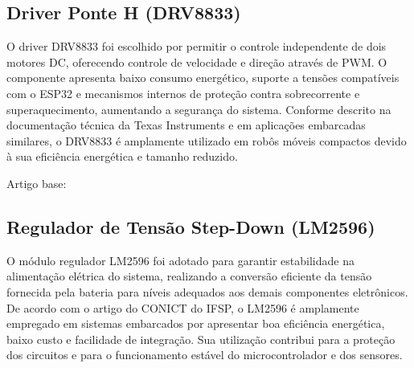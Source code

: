 

\subsection{Driver Ponte H (DRV8833)}

O driver DRV8833 foi escolhido por permitir o controle independente de dois motores DC, oferecendo controle de velocidade e direção através de PWM. O componente apresenta baixo consumo energético, suporte a tensões compatíveis com o ESP32 e mecanismos internos de proteção contra sobrecorrente e superaquecimento, aumentando a segurança do sistema. Conforme descrito na documentação técnica da Texas Instruments e em aplicações embarcadas similares, o DRV8833 é amplamente utilizado em robôs móveis compactos devido à sua eficiência energética e tamanho reduzido.

Artigo base: \cite{oliveira2024_esp32_roboticar}

\subsection{Regulador de Tensão Step-Down (LM2596)}

O módulo regulador LM2596 foi adotado para garantir estabilidade na alimentação elétrica do sistema, realizando a conversão eficiente da tensão fornecida pela bateria para níveis adequados aos demais componentes eletrônicos. De acordo com o artigo do CONICT do IFSP, o LM2596 é amplamente empregado em sistemas embarcados por apresentar boa eficiência energética, baixo custo e facilidade de integração. Sua utilização contribui para a proteção dos circuitos e para o funcionamento estável do microcontrolador e dos sensores.

